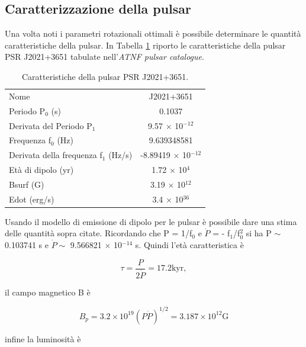 \documentclass[a4paper,twocolumn]{article}
\begin{document}
\begin{large}
\section{Caratterizzazione della pulsar}
Una volta noti i parametri rotazionali ottimali è possibile determinare le quantità caratteristiche della pulsar. In Tabella \ref{catalog} riporto le caratteristiche della pulsar PSR J2021+3651 tabulate nell'\textit{ATNF pulsar catalogue}.

\begin{table}[H]
\caption{\small Caratteristiche della pulsar PSR J2021+3651.}
\begin{tabular}{lc}
\hline
\hline
Nome & J2021+3651\\
Periodo P$_0$ (s) & 0.1037\\
Derivata del Periodo P$_1$  & 9.57 $\times$ 10$^{-12}$ \\
Frequenza f$_0$ (Hz) & 9.639348581\\
Derivata della frequenza f$_1$ (Hz/s) & -8.89419 $\times$ 10$^{-12}$\\
Età di dipolo (yr) & 1.72 $\times$ 10$^{4}$\\
Bsurf (G) & 3.19 $\times$ 10$^{12}$\\
Edot (erg/s) & 3.4 $\times$ 10$^{36}$\\ 
\hline
\end{tabular}
\label{catalog}
\end{table}

\noindent
Usando il modello di emissione di dipolo per le pulsar è possibile dare una stima delle quantità sopra citate. Ricordando che P = 1/f$_0$ e $\dot{P}$ = - f$_1$/f$_0^2$ si ha P $\sim$ 0.103741 s e $\dot{P} \sim$ 9.566821 $\times$ 10$^{-14}$ s. Quindi l'età caratteristica è

\begin{equation}
\tau = \frac{P}{2 \dot{P}} = 17.2 \mbox{kyr},
\end{equation}

il campo magnetico B è 

\begin{equation}
B_p = 3.2 \times 10^{19} \left(P \dot{P} \right)^{1/2} = 3.187 \times 10^{12} \mbox{G}
\end{equation}

infine la luminosità è


\end{large}
\end{document}
